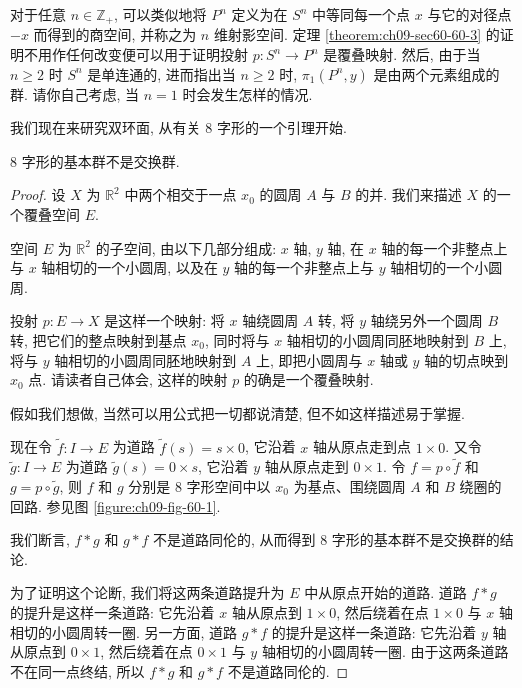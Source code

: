 对于任意 $n\in\mathbb{Z}_{+}$, 可以类似地将 $P^{n}$ 定义为在 $S^{n}$ 中等同每一个点 $x$ 与它的对径点 $-x$ 而得到的商空间, 并称之为 $n$ 维射影空间. 定理 \cref{theorem:ch09-sec60-60-3} 的证明不用作任何改变便可以用于证明投射 $p\colon S^{n}\to P^{n}$ 是覆叠映射. 然后, 由于当 $n\geqslant 2$ 时 $S^{n}$ 是单连通的, 进而指出当 $n\geqslant 2$ 时, $\pi_1(P^{n},y)$ 是由两个元素组成的群. 请你自己考虑, 当 $n=1$ 时会发生怎样的情况.

我们现在来研究双环面, 从有关 8 字形的一个引理开始.

\begin{lemma}
\label{lemma:ch09-sec60-60-5}
8 字形的基本群不是交换群.
\end{lemma}

\begin{proof}
设 $X$ 为 $\mathbb{R}^{2}$ 中两个相交于一点 $x_0$ 的圆周 $A$ 与 $B$ 的并. 我们来描述 $X$ 的一个覆叠空间 $E$.

空间 $E$ 为 $\mathbb{R}^{2}$ 的子空间, 由以下几部分组成: $x$ 轴, $y$ 轴, 在 $x$ 轴的每一个非整点上与 $x$ 轴相切的一个小圆周, 以及在 $y$ 轴的每一个非整点上与 $y$ 轴相切的一个小圆周.

投射 $p\colon E\to X$ 是这样一个映射: 将 $x$ 轴绕圆周 $A$ 转, 将 $y$ 轴绕另外一个圆周 $B$ 转, 把它们的整点映射到基点 $x_0$, 同时将与 $x$ 轴相切的小圆周同胚地映射到 $B$ 上, 将与 $y$ 轴相切的小圆周同胚地映射到 $A$ 上, 即把小圆周与 $x$ 轴或 $y$ 轴的切点映到 $x_0$ 点. 请读者自己体会, 这样的映射 $p$ 的确是一个覆叠映射.

假如我们想做, 当然可以用公式把一切都说清楚, 但不如这样描述易于掌握.

现在令 $\tilde{f}\colon I\to E$ 为道路 $\tilde{f}(s)=s\times 0$, 它沿着 $x$ 轴从原点走到点 $1\times 0$. 又令 $\tilde{g}\colon I\to E$ 为道路 $\tilde{g}(s)=0\times s$, 它沿着 $y$ 轴从原点走到 $0\times 1$. 令 $f=p\circ\tilde{f}$ 和 $g=p\circ\tilde{g}$, 则 $f$ 和 $g$ 分别是 8 字形空间中以 $x_0$ 为基点、围绕圆周 $A$ 和 $B$ 绕圈的回路. 参见图 \cref{figure:ch09-fig-60-1}.


我们断言, $f*g$ 和 $g*f$ 不是道路同伦的, 从而得到 8 字形的基本群不是交换群的结论.

为了证明这个论断, 我们将这两条道路提升为 $E$ 中从原点开始的道路. 道路 $f*g$ 的提升是这样一条道路: 它先沿着 $x$ 轴从原点到 $1\times 0$, 然后绕着在点 $1\times 0$ 与 $x$ 轴相切的小圆周转一圈. 另一方面, 道路 $g*f$ 的提升是这样一条道路: 它先沿着 $y$ 轴从原点到 $0\times 1$, 然后绕着在点 $0\times 1$ 与 $y$ 轴相切的小圆周转一圈. 由于这两条道路不在同一点终结, 所以 $f*g$ 和 $g*f$ 不是道路同伦的.
\end{proof}

